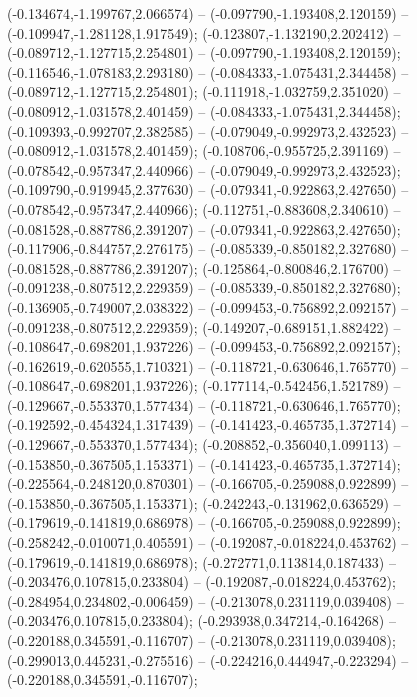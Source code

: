  (-0.134674,-1.199767,2.066574) -- (-0.097790,-1.193408,2.120159) -- (-0.109947,-1.281128,1.917549);
 (-0.123807,-1.132190,2.202412) -- (-0.089712,-1.127715,2.254801) -- (-0.097790,-1.193408,2.120159);
 (-0.116546,-1.078183,2.293180) -- (-0.084333,-1.075431,2.344458) -- (-0.089712,-1.127715,2.254801);
 (-0.111918,-1.032759,2.351020) -- (-0.080912,-1.031578,2.401459) -- (-0.084333,-1.075431,2.344458);
 (-0.109393,-0.992707,2.382585) -- (-0.079049,-0.992973,2.432523) -- (-0.080912,-1.031578,2.401459);
 (-0.108706,-0.955725,2.391169) -- (-0.078542,-0.957347,2.440966) -- (-0.079049,-0.992973,2.432523);
 (-0.109790,-0.919945,2.377630) -- (-0.079341,-0.922863,2.427650) -- (-0.078542,-0.957347,2.440966);
 (-0.112751,-0.883608,2.340610) -- (-0.081528,-0.887786,2.391207) -- (-0.079341,-0.922863,2.427650);
 (-0.117906,-0.844757,2.276175) -- (-0.085339,-0.850182,2.327680) -- (-0.081528,-0.887786,2.391207);
 (-0.125864,-0.800846,2.176700) -- (-0.091238,-0.807512,2.229359) -- (-0.085339,-0.850182,2.327680);
 (-0.136905,-0.749007,2.038322) -- (-0.099453,-0.756892,2.092157) -- (-0.091238,-0.807512,2.229359);
 (-0.149207,-0.689151,1.882422) -- (-0.108647,-0.698201,1.937226) -- (-0.099453,-0.756892,2.092157);
 (-0.162619,-0.620555,1.710321) -- (-0.118721,-0.630646,1.765770) -- (-0.108647,-0.698201,1.937226);
 (-0.177114,-0.542456,1.521789) -- (-0.129667,-0.553370,1.577434) -- (-0.118721,-0.630646,1.765770);
 (-0.192592,-0.454324,1.317439) -- (-0.141423,-0.465735,1.372714) -- (-0.129667,-0.553370,1.577434);
 (-0.208852,-0.356040,1.099113) -- (-0.153850,-0.367505,1.153371) -- (-0.141423,-0.465735,1.372714);
 (-0.225564,-0.248120,0.870301) -- (-0.166705,-0.259088,0.922899) -- (-0.153850,-0.367505,1.153371);
 (-0.242243,-0.131962,0.636529) -- (-0.179619,-0.141819,0.686978) -- (-0.166705,-0.259088,0.922899);
 (-0.258242,-0.010071,0.405591) -- (-0.192087,-0.018224,0.453762) -- (-0.179619,-0.141819,0.686978);
 (-0.272771,0.113814,0.187433) -- (-0.203476,0.107815,0.233804) -- (-0.192087,-0.018224,0.453762);
 (-0.284954,0.234802,-0.006459) -- (-0.213078,0.231119,0.039408) -- (-0.203476,0.107815,0.233804);
 (-0.293938,0.347214,-0.164268) -- (-0.220188,0.345591,-0.116707) -- (-0.213078,0.231119,0.039408);
 (-0.299013,0.445231,-0.275516) -- (-0.224216,0.444947,-0.223294) -- (-0.220188,0.345591,-0.116707);
